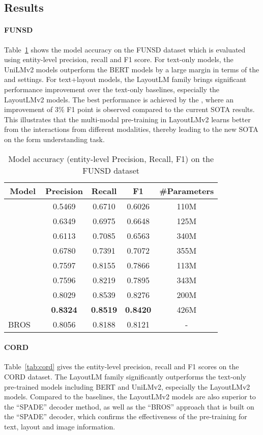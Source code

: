 \documentclass{article} \usepackage{iclr2021_conference,times}
\begin{document}
\subsection{Results}

\paragraph{FUNSD}
Table~\ref{tab:funsd} shows the model accuracy on the FUNSD dataset which is evaluated using entity-level precision, recall and F1 score. For text-only models, the UniLMv2 models outperform the BERT models by a large margin in terms of the  and  settings. For text+layout models, the LayoutLM family brings significant performance improvement over the text-only baselines, especially the LayoutLMv2 models. The best performance is achieved by the , where an improvement of 3\% F1 point is observed compared to the current SOTA results. This illustrates that the multi-modal pre-training in LayoutLMv2 learns better from the interactions from different modalities, thereby leading to the new SOTA on the form understanding task.

\begin{table}[ht]
    \centering
    \small
    \begin{tabular}{lcccc}
    \toprule
       \multicolumn{1}{c}{\bf Model} & \bf Precision & \bf Recall & \bf F1 & \bf \#Parameters  \\\midrule
        & 0.5469 & 0.6710 & 0.6026 & 110M \\
        & 0.6349 & 0.6975 & 0.6648 & 125M  \\
         & 0.6113 & 0.7085 & 0.6563 & 340M \\
        & 0.6780 & 0.7391 & 0.7072 & 355M \\\midrule
       & 0.7597 & 0.8155 & 0.7866 & 113M \\
       & 0.7596 & 0.8219 & 0.7895 & 343M \\\midrule
       & 0.8029 & 0.8539 & 0.8276 & 200M \\
       & \bf 0.8324 & \bf 0.8519 & \bf 0.8420 & 426M \\\midrule
      \midrule
BROS ~\citep{anonymous2021bros} & 0.8056 & 0.8188 & 0.8121 & - \\
     \bottomrule
    \end{tabular}
    \caption{Model accuracy (entity-level Precision, Recall, F1) on the FUNSD dataset}
    \label{tab:funsd}
\end{table}

\paragraph{CORD}
Table~\ref{tab:cord} gives the entity-level precision, recall and F1 scores on the CORD dataset. The LayoutLM family significantly outperforms the text-only pre-trained models including BERT and UniLMv2, especially the LayoutLMv2 models. Compared to the baselines, the LayoutLMv2 models are also superior to the ``SPADE'' decoder method, as well as the ``BROS'' approach that is built on the ``SPADE'' decoder, which confirms the effectiveness of the pre-training for text, layout and image information.
\end{document}
